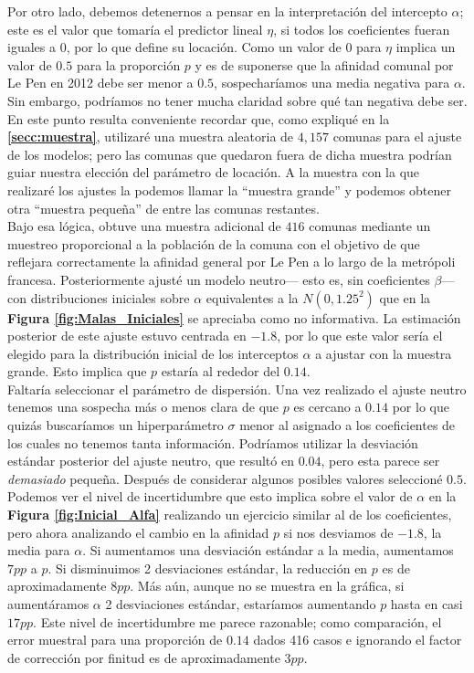 Por otro lado, debemos detenernos a pensar en la interpretación del intercepto $\alpha$; este es el valor que tomaría el predictor lineal $\eta$, si todos los coeficientes fueran iguales a $0$, por lo que define su locación. Como un valor de $0$ para $\eta$ implica un valor de $0.5$ para la proporción $p$ y es de suponerse que la afinidad comunal por Le Pen en 2012 debe ser menor a $0.5$, sospecharíamos una media negativa para $\alpha$. Sin embargo, podríamos no tener mucha claridad sobre qué tan negativa debe ser.\\ 

En este punto resulta conveniente recordar que, como expliqué en la \textbf{\autoref{secc:muestra}}, utilizaré una muestra aleatoria de $4,157$ comunas para el ajuste de los modelos; pero las comunas que quedaron fuera de dicha muestra podrían guiar nuestra elección del parámetro de locación. A la muestra con la que realizaré los ajustes la podemos llamar la ``muestra grande'' y podemos obtener otra ``muestra pequeña'' de entre las comunas restantes.\\

Bajo esa lógica, obtuve una muestra adicional de $416$ comunas mediante un muestreo proporcional a la población de la comuna con el objetivo de que reflejara correctamente la afinidad general por Le Pen a lo largo de la metrópoli francesa. Posteriormente ajusté un modelo neutro--- esto es, sin coeficientes $\beta$--- con distribuciones iniciales sobre $\alpha$ equivalentes a la $N(0,1.25^2)$ que en la \textbf{Figura \ref{fig:Malas_Iniciales}} se apreciaba como no informativa. La estimación posterior de este ajuste estuvo centrada en $-1.8$, por lo que este valor sería el elegido para la distribución inicial de los interceptos $\alpha$ a ajustar con la muestra grande. Esto implica que $p$ estaría al rededor del $0.14$.\\

Faltaría seleccionar el parámetro de dispersión. Una vez realizado el ajuste neutro tenemos una sospecha más o menos clara de que $p$ es cercano a $0.14$ por lo que quizás buscaríamos un hiperparámetro $\sigma$ menor al asignado a los coeficientes de los cuales no tenemos tanta información. Podríamos utilizar la desviación estándar posterior del ajuste neutro, que resultó en $0.04$, pero esta parece ser \textit{demasiado} pequeña. Después de considerar algunos posibles valores seleccioné $0.5$. Podemos ver el nivel de incertidumbre que esto implica sobre el valor de $\alpha$ en la \textbf{Figura \ref{fig:Inicial_Alfa}} realizando un ejercicio similar al de los coeficientes, pero ahora analizando el cambio en la afinidad $p$ si nos desviamos de $-1.8$, la media para $\alpha$. Si aumentamos una desviación estándar a la media, aumentamos $7pp$ a $p$. Si disminuimos 2 desviaciones estándar, la reducción en $p$ es de aproximadamente $8pp$. Más aún, aunque no se muestra en la gráfica, si aumentáramos $\alpha$ 2 desviaciones estándar, estaríamos aumentando $p$ hasta en casi $17pp$. Este nivel de incertidumbre me parece razonable; como comparación, el error muestral para una proporción de $0.14$ dados 416 casos e ignorando el factor de corrección por finitud es de aproximadamente $3pp$.\\

